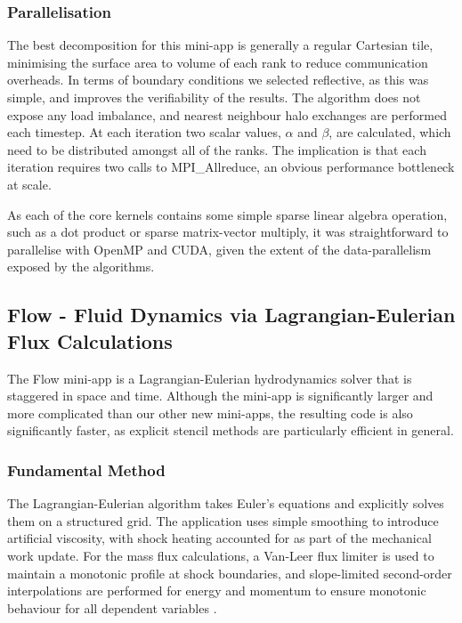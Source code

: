 \documentclass[runningheads,a4paper]{llncs}
\begin{document}
\subsubsection{Parallelisation}

The best decomposition for this mini-app is generally a regular Cartesian tile, minimising the surface area to volume of each rank to reduce communication overheads. In terms of boundary conditions we selected reflective, as this was simple, and improves the verifiability of the results. The algorithm does not expose any load imbalance, and nearest neighbour halo exchanges are performed each timestep. At each iteration two scalar values, $\alpha$ and $\beta$, are calculated, which need to be distributed amongst all of the ranks. The implication is that each iteration requires two calls to MPI\_Allreduce, an obvious performance bottleneck at scale. 

As each of the core kernels contains some simple sparse linear algebra operation, such as a dot product or sparse matrix-vector multiply, it was straightforward to parallelise with OpenMP and CUDA, given the extent of the data-parallelism exposed by the algorithms.

\subsection{Flow - Fluid Dynamics via Lagrangian-Eulerian Flux Calculations}

\label{sec:flow}

The Flow mini-app is a Lagrangian-Eulerian hydrodynamics solver that is staggered in space and time. Although the mini-app is significantly larger and more complicated than our other new mini-apps, the resulting code is also significantly faster, as explicit stencil methods are particularly efficient in general.

\subsubsection{Fundamental Method}

The Lagrangian-Eulerian algorithm takes Euler's equations and explicitly solves them on a structured grid. The application uses simple smoothing to introduce artificial viscosity, with shock heating accounted for as part of the mechanical work update. For the mass flux calculations, a Van-Leer flux limiter is used to maintain a monotonic profile at shock boundaries, and slope-limited second-order interpolations are performed for energy and momentum to ensure monotonic behaviour for all dependent variables \cite{Berger2005}.
\end{document}
